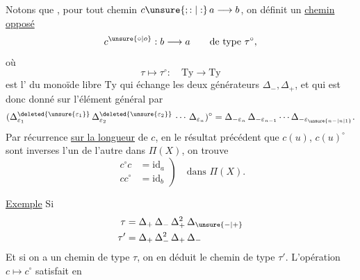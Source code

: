  Notons que , pour tout chemin $c\unsure{;:|:}\,a\longrightarrow b$,  on définit un \uline{chemin opposé}
\[c^{\unsure{\circ|o}}:b\longrightarrow a\qquad\text{de type }\tau^\circ,\]
où
\[\tau\longmapsto\tau^\circ:\quad\mathrm{Ty}\longrightarrow\mathrm{Ty}\]
est l'  du monoïde libre $\mathrm{Ty}$ qui échange les deux générateurs $\Delta_-,\Delta_+$, et qui  est donc donné sur l'élément général par
\[(\Delta_{\varepsilon_1}^{\deleted{\unsure{\varepsilon_1}}}\,\Delta_{\varepsilon_2}^{\deleted{\unsure{\varepsilon_2}}}\,\cdots\,\Delta_{\varepsilon_n})^\circ
=\Delta_{-\varepsilon_n}\,\Delta_{-\varepsilon_{n-1}}\cdots\Delta_{-\varepsilon_{\unsure{n-|n|1}}}.\]
Par récurrence \uline{sur la longueur} de $c$, en   le résultat précédent  que $c(u)$, $c(u)^\circ$ sont inverses l'un de l'autre dans $\Pi(X)$, on trouve
\[\left.\begin{aligned}c^\circ c&=\mathrm{id}_a\\cc^\circ&=\mathrm{id}_b\end{aligned}\right)\quad\text{dans }\Pi(X).\]

\uline{Exemple} Si
\[\begin{aligned}\tau&=\Delta_+\,\Delta_-\,\Delta_+^2\,\Delta_{\unsure{-|+}}\\
\tau'&=\Delta_+\,\Delta_-^2\,\Delta_+\,\Delta_-\end{aligned}\]
Et si on a un chemin
de type $\tau$, on en déduit  le chemin
de type $\tau'$. L'opération $c\longmapsto c^\circ$ satisfait en
